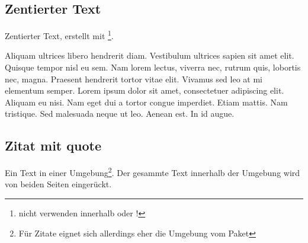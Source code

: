 \subsection{Zentierter Text}
%
Zentierter Text, erstellt mit \footnote{nicht verwenden innerhalb  oder !}.
\begin{center}
Aliquam ultrices libero hendrerit diam. Vestibulum ultrices sapien sit amet elit. Quisque tempor nisl eu sem. Nam lorem lectus, viverra nec, rutrum quis, lobortis nec, magna. Praesent hendrerit tortor vitae elit. Vivamus sed leo at mi elementum semper. Lorem ipsum dolor sit amet, consectetuer adipiscing elit. Aliquam eu nisi. Nam eget dui a tortor congue imperdiet. Etiam mattis. Nam tristique. Sed malesuada neque ut leo. Aenean est. In id augue.
\end{center}

\subsection{Zitat mit quote}
Ein Text in einer  Umgebung\footnote{Für Zitate eignet sich allerdings eher die Umgebung  vom Paket }. Der gesammte Text innerhalb der Umgebung wird von beiden Seiten eingerückt.

